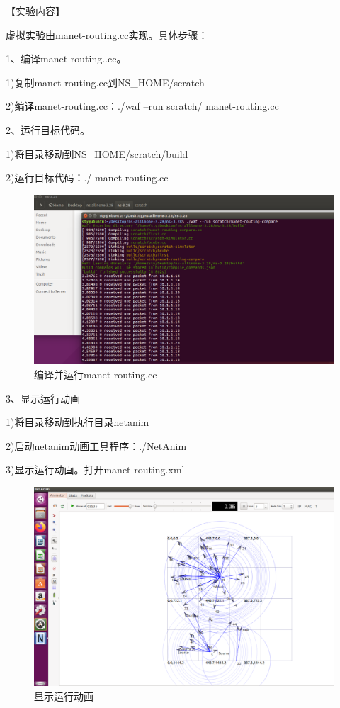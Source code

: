 \documentclass[lang=cn,11pt,a4paper,cite=authoryear]{elegantpaper}
\begin{document}
【实验内容】

虚拟实验由manet-routing.cc实现。具体步骤：

1、编译manet-routing..cc。

1)复制manet-routing.cc到NS\_HOME/scratch

2)编译manet-routing.cc：./waf –run scratch/ manet-routing.cc

2、运行目标代码。

1)将目录移动到NS\_HOME/scratch/build

2)运行目标代码：./ manet-routing.cc

\begin{figure}[htbp]
	\centering
	\includegraphics[width=0.8\linewidth]{image/screenshot021}
	\caption{编译并运行manet-routing.cc}
	\label{fig:screenshot021}
\end{figure}


3、显示运行动画

1)将目录移动到执行目录netanim

2)启动netanim动画工具程序：./NetAnim

3)显示运行动画。打开manet-routing.xml

\begin{figure}[htbp]
	\centering
	\includegraphics[width=0.9\linewidth]{image/screenshot022}
	\caption{显示运行动画}
	\label{fig:screenshot022}
\end{figure}
\end{document}
